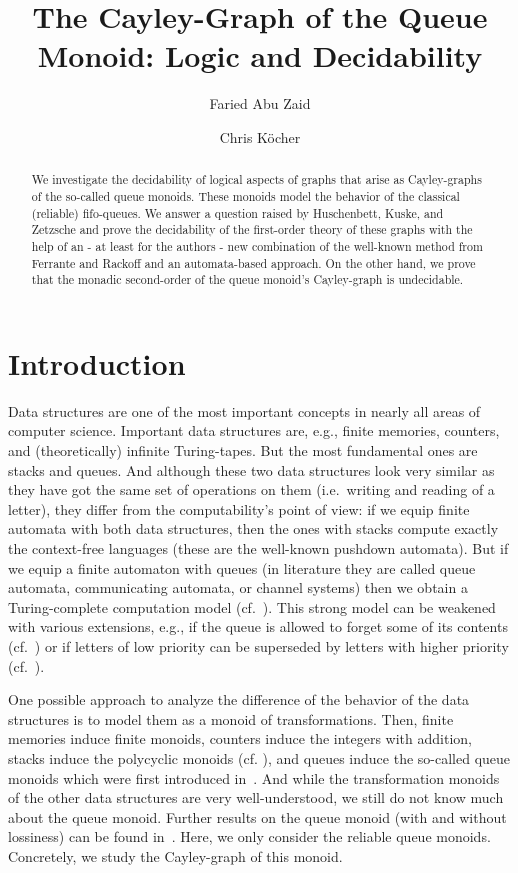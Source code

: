 \documentclass[a4paper,numberwithinsect,USenglish]{lipics-v2018}
\title{The Cayley-Graph of the Queue Monoid: Logic and Decidability}
\author{Faried Abu Zaid}{Camelot Management Consultants, CoE Artificial Intelligence for Information Management, Munich}{faza@camelot-mc.com}{}{The presented work was conducted while the first author was affiliated with the Technische Universität Ilmenau.}
\author{Chris Köcher}{Technische Universität Ilmenau, Automata and Logics Group}{chris.koecher@tu-ilmenau.de}{https://orcid.org/0000-0003-4575-9339}{}
\theoremstyle{plain}
\theoremstyle{remark}
\begin{document}
	\maketitle

	\begin{abstract}
		We investigate the decidability of logical aspects of graphs that arise as Cayley-graphs of the so-called queue monoids. These monoids model the behavior of the classical (reliable) fifo-queues. We answer a question raised by Huschenbett, Kuske, and Zetzsche and prove the decidability of the first-order theory of these graphs with the help of an - at least for the authors - new combination of the well-known method from Ferrante and Rackoff and an automata-based approach. On the other hand, we prove that the monadic second-order of the queue monoid's Cayley-graph is undecidable.
	\end{abstract}

	\section{Introduction}
	Data structures are one of the most important concepts in nearly all areas of computer science. Important data structures are, e.g., finite memories, counters, and (theoretically) infinite Turing-tapes. But the most fundamental ones are stacks and queues. And although these two data structures look very similar as they have got the same set of operations on them (i.e.\ writing and reading of a letter), they differ from the computability's point of view: if we equip finite automata with both data structures, then the ones with stacks compute exactly the context-free languages (these are the well-known pushdown automata). But if we equip a finite automaton with queues (in literature they are called queue automata, communicating automata, or channel systems) then we obtain a Turing-complete computation model (cf.~\cite{BraZ83,Bol06}). This strong model can be weakened with various extensions, e.g., if the queue is allowed to forget some of its contents (cf.~\cite{AbdJ96,CecFP96,MasS02}) or if letters of low priority can be superseded by letters with higher priority (cf.~\cite{HaaSS14}).
	
	One possible approach to analyze the difference of the behavior of the data structures is to model them as a monoid of transformations. Then, finite memories induce finite monoids, counters induce the integers with addition, stacks induce the polycyclic monoids (cf. \cite{Sak86,kambites2009}), and queues induce the so-called queue monoids which were first introduced in~\cite{HusKZ17}. And while the transformation monoids of the other data structures are very well-understood, we still do not know much about the queue monoid. Further results on the queue monoid (with and without lossiness) can be found in~\cite{KKP18,Koe18}. Here, we only consider the reliable queue monoids. Concretely, we study the Cayley-graph of this monoid.
	
\end{document}
